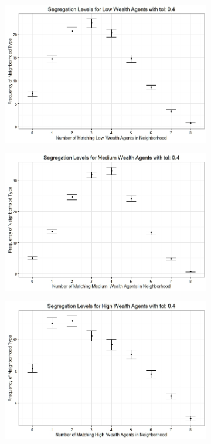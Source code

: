 \begin{figure}[h!]
\begin{subfigure}{.5\textwidth}
\end{subfigure}%
\begin{subfigure}{.5\textwidth}
  \centering
\includegraphics[scale=.35]{figures/2010_4_Low.jpeg}
\end{subfigure}
\hfill \break \hfill \break
\begin{subfigure}{.5\textwidth}
  \centering
\includegraphics[scale=.35]{figures/2010_4_Med.jpeg}
\end{subfigure}%
\begin{subfigure}{.5\textwidth}
  \centering
\includegraphics[scale=.35]{figures/2010_4_High.jpeg}

\end{subfigure}
\end{figure}
